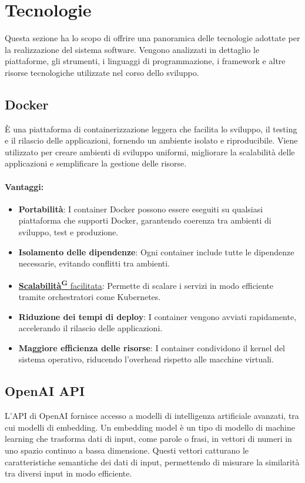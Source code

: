 \section{Tecnologie}
Questa sezione ha lo scopo di offrire una panoramica delle tecnologie adottate per la realizzazione del sistema software. Vengono analizzati in dettaglio le piattaforme, gli strumenti, i linguaggi di programmazione, i framework e altre risorse tecnologiche utilizzate nel corso dello sviluppo.


\subsection{Docker} 
È una piattaforma di containerizzazione leggera che facilita lo sviluppo, il testing e il rilascio delle applicazioni, fornendo un ambiente isolato e riproducibile. 
Viene utilizzato per creare ambienti di sviluppo uniformi, migliorare la scalabilità delle applicazioni e semplificare la gestione delle risorse. 

\paragraph{Vantaggi:} 
\begin{itemize} 
    \item \textbf{Portabilità}: I container Docker possono essere eseguiti su qualsiasi piattaforma che supporti Docker, garantendo coerenza tra ambienti di sviluppo, test e produzione. 
    \item \textbf{Isolamento delle dipendenze}: Ogni container include tutte le dipendenze necessarie, evitando conflitti tra ambienti. 
    \item \href{https://code7crusaders.github.io/docs/PB/documentazione_interna/glossario.html#scalabilità}{\textbf{Scalabilità\textsuperscript{G}} facilitata}: Permette di scalare i servizi in modo efficiente tramite orchestratori come Kubernetes. 
    \item \textbf{Riduzione dei tempi di deploy}: I container vengono avviati rapidamente, accelerando il rilascio delle applicazioni. 
    \item \textbf{Maggiore efficienza delle risorse}: I container condividono il kernel del sistema operativo, riducendo l'overhead rispetto alle macchine virtuali. 
\end{itemize} 


\subsection{OpenAI API}
L'API di OpenAI fornisce accesso a modelli di intelligenza artificiale avanzati, tra cui modelli di embedding. Un embedding model è un tipo di modello di machine learning che trasforma dati di input, come parole o frasi, in vettori di numeri in uno spazio continuo a bassa dimensione. Questi vettori catturano le caratteristiche semantiche dei dati di input, permettendo di misurare la similarità tra diversi input in modo efficiente.

